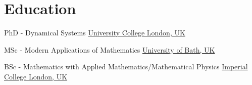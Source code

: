 \documentclass[english, print]{cv-style-wide}
\begin{document}
\section{Education}%
\vspace{-0.2cm}
\begin{entrylist}
%
{PhD \hspace{\diffpwidth/2}-\hspace{\diffpwidth/2} Dynamical Systems}%
{
\href{https://ucl.ac.uk}{University College London, UK}
}%
{}%


%
{MSc - Modern Applications of Mathematics}%
{%
\href{https://bath.ac.uk}{University of Bath, UK}%
}%
{}%

%
{BSc \hspace{\diffbwidth/2}-\hspace{\diffbwidth/2} Mathematics with Applied Mathematics/Mathematical Physics}%
{%
\href{https://imperial.ac.uk}{Imperial College London, UK}%
}%
{}%

\end{entrylist}



\end{document}
